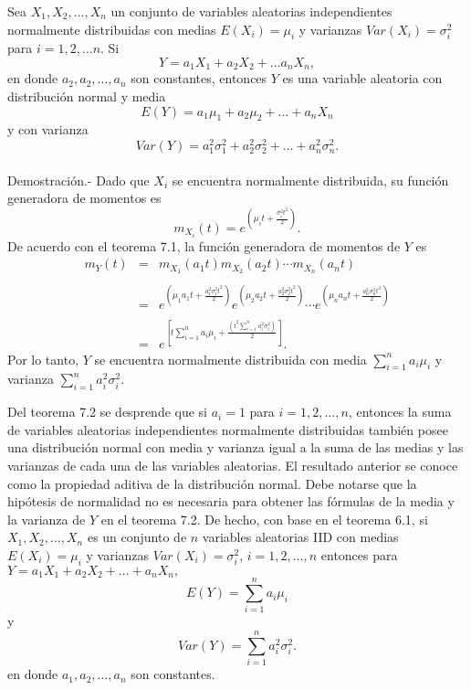 \begin{teo}
    Sea $X_1,X_2,\ldots,X_n$ un conjunto de variables aleatorias independientes normalmente distribuidas con medias $E(X_i)=\mu_i$ y varianzas $Var(X_i)=\sigma^2_i$ para $i=1,2,\ldots n$. Si
    $$Y=a_1X_1+a_2X_2+\ldots a_nX_n,$$
    en donde $a_2,a_2,\ldots,a_n$ son constantes, entonces $Y$ es una variable aleatoria con distribución normal y media
    $$E(Y)=a_1\mu_1+a_2\mu_2+\ldots + a_nX_n$$
    y con varianza 
    $$Var(Y)=a_1^2\sigma_1^2+a_2^2\sigma_2^2 + \ldots + a_n^2\sigma_n^2.$$\\
	Demostración.-\; Dado que $X_i$ se encuentra normalmente distribuida, su función generadora de momentos es
	$$m_{X_i}(t)=e^{\left(\mu_i t + \frac{\sigma_i^2t^2}{2}\right)}.$$
	De acuerdo con el teorema 7.1, la función generadora de momentos de $Y$ es
	$$\begin{array}{rcl}
	    m_Y(t)&=&m_{X_1}(a_1t)m_{X_2}(a_2t)\cdots m_{X_n}(a_nt)\\\\
		  &=&e^{\left(\mu_1 a_1t + \frac{a_1^2\sigma_1^2t^2}{2}\right)}e^{\left(\mu_2a_2t + \frac{a_2^2\sigma_2^2t^2}{2}\right)}\cdots e^{\left(\mu_n a_nt + \frac{a_n^2\sigma_n^2t^2}{2}\right)}\\\\
		  &=&e^{\left[t\sum\limits_{i=1}^n a_i\mu_i+\frac{\left(t^2\sum\limits_{i=1}^n a_i^2\sigma_i^2\right)}{2}\right]}.
      \end{array}$$
      Por lo tanto, $Y$ se encuentra normalmente distribuida con media $\sum_{i=1}^na_i\mu_i$ y varianza $\sum_{i=1}^n a_i^2 \sigma_i^2.$
\end{teo}

Del teorema 7.2 se desprende que si $a_i=1$ para $i=1,2,\ldots,n$, entonces la suma de variables aleatorias independientes normalmente distribuidas también posee una distribución normal con media y varianza igual a la suma de las medias y las varianzas de cada una de las variables aleatorias. El resultado anterior se conoce como la propiedad aditiva de la distribución normal. Debe notarse que la hipótesis de normalidad no es necesaria para obtener las fórmulas de la media y la varianza de $Y$ en el teorema 7.2. De hecho, con base en el teorema 6.1, si $X_1,X_2,\ldots , X_n$ es un conjunto de $n$ variables aleatorias IID con medias $E(X_i)=\mu_i$ y varianzas $Var(X_i)=\sigma_i^2$, $i=1,2,\ldots , n$ entonces para $Y=a_1X_1+a_2X_2+\ldots +a_nX_n,$
$$E(Y)=\sum_{i=1}^{n}a_i\mu_i$$
y
$$Var(Y)=\sum_{i=1}^n a_i^2 \sigma_i^2.$$
en donde $a_1,a_2,\ldots,a_n$ son constantes.


